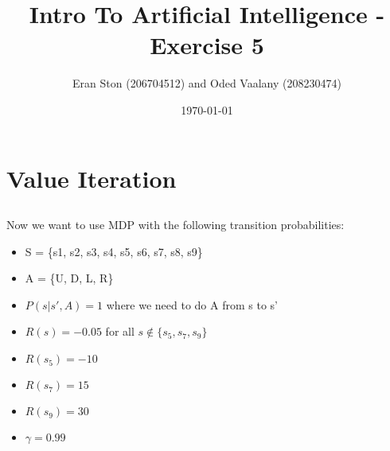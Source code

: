 \documentclass{article}
\title{Intro To Artificial Intelligence - Exercise 5}
\author{Eran Ston (206704512) and Oded Vaalany (208230474)}
\date{\today}
\begin{document}
\maketitle
\section{Value Iteration}
\subsection{}
Now we want to use MDP with the following transition probabilities:
\begin{itemize}
    \item S = \{s1, s2, s3, s4, s5, s6, s7, s8, s9\}
    \item A = \{U, D, L, R\}
    \item $P(s|s',A) = 1$ where we need to do A from s to s'
    \item $R(s) = -0.05$ for all $s\not\in \{s_5,s_7,s_9\}$
    \item $R(s_5) = -10$ 
    \item $R(s_7) = 15$ 
    \item $R(s_9) = 30$
    \item $\gamma = 0.99$
\end{itemize}
\end{document}
